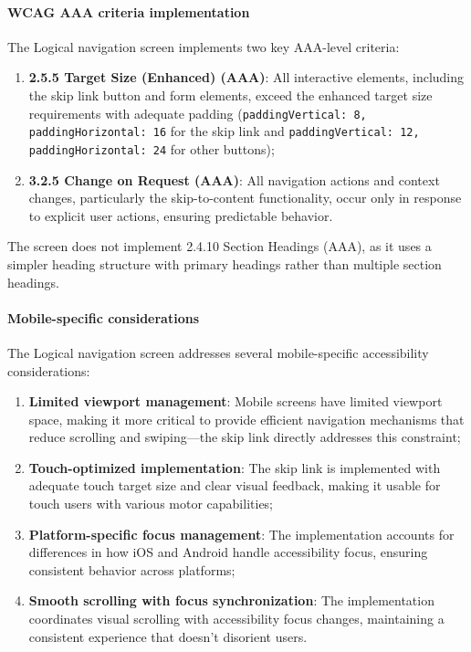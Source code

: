 \paragraph{WCAG AAA criteria implementation}

The Logical navigation screen implements two key AAA-level criteria:

\begin{enumerate}
    \item \textbf{2.5.5 Target Size (Enhanced) (AAA)}: All interactive elements, including the skip link button and form elements, exceed the enhanced target size requirements with adequate padding (\texttt{paddingVertical: 8, paddingHorizontal: 16} for the skip link and \texttt{paddingVertical: 12, paddingHorizontal: 24} for other buttons);
    
    \item \textbf{3.2.5 Change on Request (AAA)}: All navigation actions and context changes, particularly the skip-to-content functionality, occur only in response to explicit user actions, ensuring predictable behavior.
\end{enumerate}

The screen does not implement 2.4.10 Section Headings (AAA), as it uses a simpler heading structure with primary headings rather than multiple section headings.

\paragraph{Mobile-specific considerations}

The Logical navigation screen addresses several mobile-specific accessibility considerations:

\begin{enumerate}
    \item \textbf{Limited viewport management}: Mobile screens have limited viewport space, making it more critical to provide efficient navigation mechanisms that reduce scrolling and swiping—the skip link directly addresses this constraint;
    
    \item \textbf{Touch-optimized implementation}: The skip link is implemented with adequate touch target size and clear visual feedback, making it usable for touch users with various motor capabilities;
    
    \item \textbf{Platform-specific focus management}: The implementation accounts for differences in how iOS and Android handle accessibility focus, ensuring consistent behavior across platforms;
    
    \item \textbf{Smooth scrolling with focus synchronization}: The implementation coordinates visual scrolling with accessibility focus changes, maintaining a consistent experience that doesn't disorient users.
\end{enumerate}

